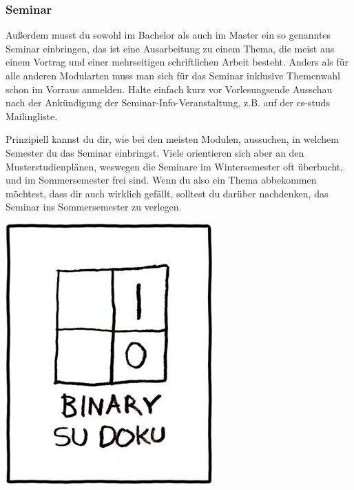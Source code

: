 	\subsubsection{Seminar}
	Außerdem musst du sowohl im Bachelor als auch im Master ein so genanntes Seminar einbringen, das ist eine Ausarbeitung zu einem Thema, die meist aus einem Vortrag und einer mehrseitigen schriftlichen Arbeit besteht. Anders als für alle anderen Modularten muss man sich für das Seminar inklusive Themenwahl schon im Vorraus anmelden. Halte einfach kurz vor Vorlesungsende Ausschau nach der Ankündigung der Seminar-Info-Veranstaltung, z.B. auf der cs-studs Mailingliste.

	Prinzipiell kannst du dir, wie bei den meisten Modulen, aussuchen, in welchem Semester du das Seminar einbringst. Viele orientieren sich aber an den Musterstudienplänen, weswegen die Seminare im Wintersemester oft überbucht, und im Sommersemester frei sind. Wenn du also ein Thema abbekommen möchtest, dass dir auch wirklich gefällt, solltest du darüber nachdenken, das Seminar ins Sommersemester zu verlegen.

	\vspace{0.5cm}	
	\includegraphics[totalheight=6cm]{bilder/XKCD/su_doku}
	
